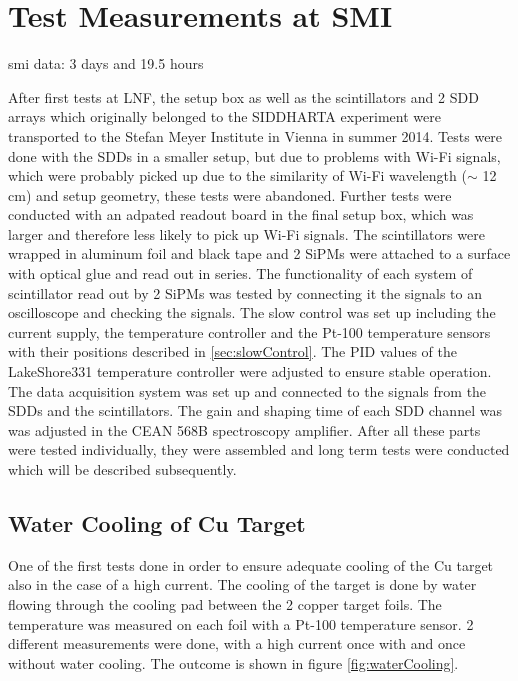 \section{Test Measurements at SMI}

smi data: 3 days and 19.5 hours

After first tests at LNF, the setup box as well as the scintillators and 2 SDD arrays which originally belonged to the SIDDHARTA experiment were transported to the Stefan Meyer Institute in Vienna in summer 2014. Tests were done with the SDDs in a smaller setup, but due to problems with Wi-Fi signals, which were probably picked up due to the similarity of Wi-Fi wavelength ($\sim$ 12 cm) and setup geometry, these tests were abandoned. Further tests were conducted with an adpated readout board in the final setup box, which was larger and therefore less likely to pick up Wi-Fi signals. The scintillators were wrapped in aluminum foil and black tape and 2 SiPMs were attached to a surface with optical glue and read out in series. The functionality of each system of scintillator read out by 2 SiPMs was tested by connecting it the signals to an oscilloscope and checking the signals. The slow control was set up including the current supply, the temperature controller and the Pt-100 temperature sensors with their positions described in \ref{sec:slowControl}. The PID values of the LakeShore331 temperature controller were adjusted to ensure stable operation. The data acquisition system was set up and connected to the signals from the SDDs and the scintillators. The gain and shaping time of each SDD channel was was adjusted in the CEAN 568B spectroscopy amplifier. After all these parts were tested individually, they were assembled and long term tests were conducted which will be described subsequently.

\subsection{Water Cooling of Cu Target}

One of the first tests done in order to ensure adequate cooling of the Cu target also in the case of a high current. The cooling of the target is done by water flowing through the cooling pad between the 2 copper target foils. The temperature was measured on each foil with a Pt-100 temperature sensor. 2 different measurements were done, with a high current once with and once without water cooling. The outcome is shown in figure \ref{fig:waterCooling}.

